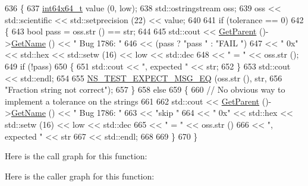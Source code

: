 \begin{DoxyCode}
636 \{
637   \hyperlink{classint64x64__t}{int64x64\_t} value (0, low);
638   std::ostringstream oss;
639   oss << std::scientific << std::setprecision (22) << value;
640 
641   \textcolor{keywordflow}{if} (tolerance == 0)
642     \{
643       \textcolor{keywordtype}{bool} pass = oss.str () == str;
644   
645       std::cout << \hyperlink{classns3_1_1TestCase_af41db0462b844c9f81838d0e61ecd563}{GetParent} ()->\hyperlink{classns3_1_1TestCase_a28f7bb59669c24dae1c290fc17fc9b62}{GetName} () << \textcolor{stringliteral}{" Bug 1786: "}
646                 << (pass ? \textcolor{stringliteral}{"pass "} : \textcolor{stringliteral}{"FAIL "})
647                 << \textcolor{stringliteral}{"    0x"} << std::hex << std::setw (16) << low << std::dec
648                 << \textcolor{stringliteral}{" = "}    << oss.str ();
649       \textcolor{keywordflow}{if} (!pass)
650         \{
651           std::cout << \textcolor{stringliteral}{", expected "} << str;
652         \}
653       std::cout << std::endl;
654 
655       \hyperlink{group__testing_ga7304ba46a28d8cf08dfdfd6499cf7068}{NS\_TEST\_EXPECT\_MSG\_EQ} (oss.str (), str,
656                              \textcolor{stringliteral}{"Fraction string not correct"});
657     \}
658   \textcolor{keywordflow}{else}
659     \{
660       \textcolor{comment}{// No obvious way to implement a tolerance on the strings}
661       
662       std::cout << \hyperlink{classns3_1_1TestCase_af41db0462b844c9f81838d0e61ecd563}{GetParent} ()->\hyperlink{classns3_1_1TestCase_a28f7bb59669c24dae1c290fc17fc9b62}{GetName} () << \textcolor{stringliteral}{" Bug 1786: "}
663                 << \textcolor{stringliteral}{"skip "}
664                 << \textcolor{stringliteral}{"    0x"} << std::hex << std::setw (16) << low << std::dec
665                 << \textcolor{stringliteral}{" = "}    << oss.str ()
666                 << \textcolor{stringliteral}{", expected "} << str
667                 << std::endl;
668 
669     \}
670 \}
\end{DoxyCode}


Here is the call graph for this function\+:




Here is the caller graph for this function\+:


